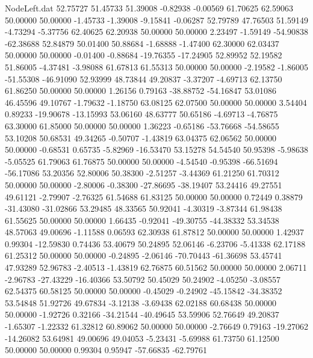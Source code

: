 \begin{filecontents}{NodeLeft.dat}
  52.75727   51.45733   51.39008    -0.82938   -0.00569   61.70625   62.59063   50.00000   50.00000   -1.45733   -1.39008   -9.15841   -0.06287
  52.79789   47.76503   51.59149    -4.73294   -5.37756   62.40625   62.20938   50.00000   50.00000    2.23497   -1.59149  -54.90838  -62.38688
  52.84879   50.01400   50.88684    -1.68888   -1.47400   62.30000   62.03437   50.00000   50.00000   -0.01400   -0.88684  -19.76355  -17.24905
  52.89952   52.19582   51.86005    -4.37481   -3.98088   61.67813   61.55313   50.00000   50.00000   -2.19582   -1.86005  -51.55308  -46.91090
  52.93999   48.73844   49.20837    -3.37207   -4.69713   62.13750   61.86250   50.00000   50.00000    1.26156    0.79163  -38.88752  -54.16847
  53.01086   46.45596   49.10767    -1.79632   -1.18750   63.08125   62.07500   50.00000   50.00000    3.54404    0.89233  -19.90678  -13.15993
  53.06160   48.63777   50.65186    -4.69713   -4.76875   63.30000   61.85000   50.00000   50.00000    1.36223   -0.65186  -53.76668  -54.58655
  53.10208   50.68531   49.34265    -0.50707   -1.43819   63.04375   62.06562   50.00000   50.00000   -0.68531    0.65735   -5.82969  -16.53470
  53.15278   54.54540   50.95398    -5.98638   -5.05525   61.79063   61.76875   50.00000   50.00000   -4.54540   -0.95398  -66.51694  -56.17086
  53.20356   52.80006   50.38300    -2.51257   -3.44369   61.21250   61.70312   50.00000   50.00000   -2.80006   -0.38300  -27.86695  -38.19407
  53.24416   49.27551   49.61121    -2.79907   -2.76325   61.54688   61.83125   50.00000   50.00000    0.72449    0.38879  -31.43080  -31.02866
  53.29485   48.33565   50.92041    -4.30319   -3.87344   61.98438   61.55625   50.00000   50.00000    1.66435   -0.92041  -49.30755  -44.38332
  53.34538   48.57063   49.00696    -1.11588    0.06593   62.30938   61.87812   50.00000   50.00000    1.42937    0.99304  -12.59830    0.74436
  53.40679   50.24895   52.06146    -6.23706   -5.41338   62.17188   61.25312   50.00000   50.00000   -0.24895   -2.06146  -70.70443  -61.36698
  53.45741   47.93289   52.96783    -2.40513   -1.43819   62.76875   60.51562   50.00000   50.00000    2.06711   -2.96783  -27.43229  -16.40366
  53.50792   50.45029   50.24902    -4.05250   -3.08557   62.54375   60.58125   50.00000   50.00000   -0.45029   -0.24902  -45.15842  -34.38352
  53.54848   51.92726   49.67834    -3.12138   -3.69438   62.02188   60.68438   50.00000   50.00000   -1.92726    0.32166  -34.21544  -40.49645
  53.59906   52.76649   49.20837    -1.65307   -1.22332   61.32812   60.89062   50.00000   50.00000   -2.76649    0.79163  -19.27062  -14.26082
  53.64981   49.00696   49.04053    -5.23431   -5.69988   61.73750   61.12500   50.00000   50.00000    0.99304    0.95947  -57.66835  -62.79761

\end{filecontents}
